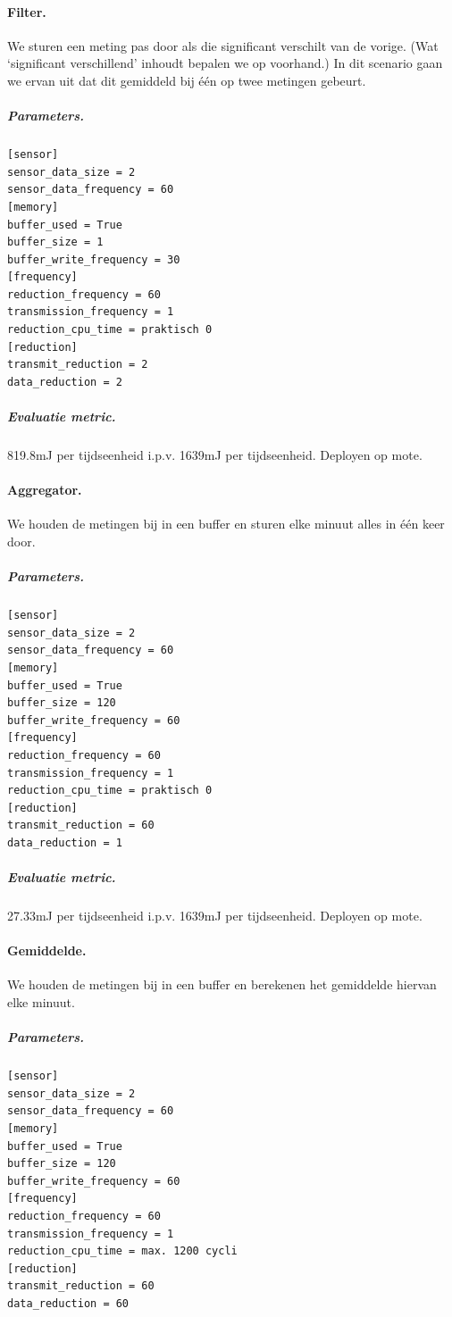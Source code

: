 \documentclass[11pt]{article}
\begin{document}
\paragraph{Filter.} We sturen een meting pas door als die significant verschilt
van de vorige. (Wat `significant verschillend' inhoudt bepalen we op voorhand.)
In dit scenario gaan we ervan uit dat dit gemiddeld bij \'e\'en op twee metingen
gebeurt.

\subparagraph{Parameters.}
\begin{verbatim}
[sensor]
sensor_data_size = 2
sensor_data_frequency = 60
[memory]
buffer_used = True
buffer_size = 1
buffer_write_frequency = 30
[frequency]
reduction_frequency = 60
transmission_frequency = 1
reduction_cpu_time = praktisch 0
[reduction]
transmit_reduction = 2
data_reduction = 2
\end{verbatim}
\subparagraph{Evaluatie metric.} 819.8mJ per tijdseenheid i.p.v. 1639mJ per tijdseenheid. Deployen op mote.

\paragraph{Aggregator.} We houden de metingen bij in een buffer en sturen elke
minuut alles in \'e\'en keer door.

\subparagraph{Parameters.}
\begin{verbatim}
[sensor]
sensor_data_size = 2
sensor_data_frequency = 60
[memory]
buffer_used = True
buffer_size = 120
buffer_write_frequency = 60
[frequency]
reduction_frequency = 60
transmission_frequency = 1
reduction_cpu_time = praktisch 0
[reduction]
transmit_reduction = 60
data_reduction = 1
\end{verbatim}
\subparagraph{Evaluatie metric.} 27.33mJ  per tijdseenheid i.p.v. 1639mJ per tijdseenheid. Deployen op mote.

\paragraph{Gemiddelde.} We houden de metingen bij in een buffer en berekenen het
gemiddelde hiervan elke minuut.

\subparagraph{Parameters.}
\begin{verbatim}
[sensor]
sensor_data_size = 2
sensor_data_frequency = 60
[memory]
buffer_used = True
buffer_size = 120
buffer_write_frequency = 60
[frequency]
reduction_frequency = 60
transmission_frequency = 1
reduction_cpu_time = max. 1200 cycli
[reduction]
transmit_reduction = 60
data_reduction = 60
\end{verbatim}
\end{document}
